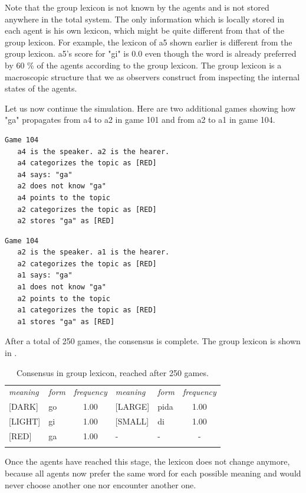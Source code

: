 Note that the group lexicon is not known by the agents
and is not stored anywhere in the 
total system. The only information which is locally stored in each 
agent is his own lexicon, which might be quite different from that 
of the group lexicon. For example, the lexicon of {\bfshape a5} shown earlier
is different from the group lexicon.
{\bfshape a5}'s score for "gi" is 0.0
even though the word is already preferred by 60 \% of 
the agents according to the group lexicon. 
The group lexicon is a macroscopic structure that we
as observers construct from inspecting the internal 
states of the agents. 

Let us now continue the simulation. Here are two additional
games showing how "ga" propagates from {\bfshape a4} to {\bfshape a2} in 
game 101 and from {\bfshape a2} to {\bfshape a1} in game 104. 
\begin{verbatim}
Game 104
   a4 is the speaker. a2 is the hearer. 
   a4 categorizes the topic as [RED]
   a4 says: "ga"
   a2 does not know "ga"
   a4 points to the topic
   a2 categorizes the topic as [RED]
   a2 stores "ga" as [RED]
\end{verbatim}
\begin{verbatim}
Game 104
   a2 is the speaker. a1 is the hearer. 
   a2 categorizes the topic as [RED]
   a1 says: "ga"
   a1 does not know "ga"
   a2 points to the topic
   a1 categorizes the topic as [RED]
   a1 stores "ga" as [RED]
\end{verbatim}
After a total of 250 games, the consensus is complete. 
The group lexicon is shown in . 
\begin{table}
\begin{center}
\begin{tabular}{l  l  c  l  l  c } \midrule 
{\itshape meaning} & {\itshape form} & {\itshape frequency} & {\itshape meaning} & {\itshape form} & {\itshape frequency}\\  
{}[DARK]& go & 1.00 & [LARGE]& pida & 1.00 \\  
{}[LIGHT]& gi & 1.00 & [SMALL]& di & 1.00 \\  
{}[RED]& ga & 1.00 & - & - & -  \\  
\lspbottomrule
\end{tabular}
\caption{\label{tab:t-mem5} Consensus in group lexicon, reached after 250 games.}
\end{center}
\end{table}
Once the agents have reached this stage, the lexicon does not 
change anymore, because all agents now prefer the same word for 
each possible meaning and would never choose another one
nor encounter another one. 

